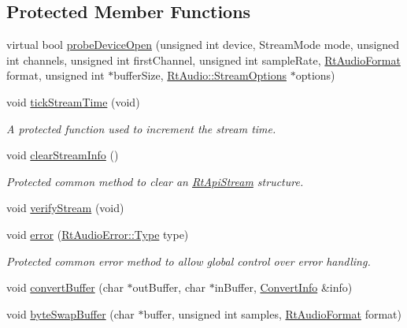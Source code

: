\subsection*{Protected Member Functions}
\begin{DoxyCompactItemize}
\item 
virtual bool \hyperlink{class_rt_api_a7cb2af485df310d803e7a35d3e4a2c1b}{probe\+Device\+Open} (unsigned int device, Stream\+Mode mode, unsigned int channels, unsigned int first\+Channel, unsigned int sample\+Rate, \hyperlink{_rt_audio_8h_aafca92882d25915560018873221e44b8}{Rt\+Audio\+Format} format, unsigned int $\ast$buffer\+Size, \hyperlink{struct_rt_audio_1_1_stream_options}{Rt\+Audio\+::\+Stream\+Options} $\ast$options)
\item 
void \hyperlink{class_rt_api_ae20a4060301413ddcddc6bf149bbf911}{tick\+Stream\+Time} (void)\hypertarget{class_rt_api_ae20a4060301413ddcddc6bf149bbf911}{}\label{class_rt_api_ae20a4060301413ddcddc6bf149bbf911}

\begin{DoxyCompactList}\small\item\em A protected function used to increment the stream time. \end{DoxyCompactList}\item 
void \hyperlink{class_rt_api_adb7ab7111510e3db1f0884a68926b5a4}{clear\+Stream\+Info} ()\hypertarget{class_rt_api_adb7ab7111510e3db1f0884a68926b5a4}{}\label{class_rt_api_adb7ab7111510e3db1f0884a68926b5a4}

\begin{DoxyCompactList}\small\item\em Protected common method to clear an \hyperlink{struct_rt_api_1_1_rt_api_stream}{Rt\+Api\+Stream} structure. \end{DoxyCompactList}\item 
void \hyperlink{class_rt_api_acb0a053f68f082bb0f7ed4d056be1ea6}{verify\+Stream} (void)
\item 
void \hyperlink{class_rt_api_a991f6626a0b1a79f0fec1c6a7bcebb9e}{error} (\hyperlink{class_rt_audio_error_a85bdee746d5ba80d655ac98ded21d073}{Rt\+Audio\+Error\+::\+Type} type)\hypertarget{class_rt_api_a991f6626a0b1a79f0fec1c6a7bcebb9e}{}\label{class_rt_api_a991f6626a0b1a79f0fec1c6a7bcebb9e}

\begin{DoxyCompactList}\small\item\em Protected common error method to allow global control over error handling. \end{DoxyCompactList}\item 
void \hyperlink{class_rt_api_a85ed0a3827faddf0c796869e72800850}{convert\+Buffer} (char $\ast$out\+Buffer, char $\ast$in\+Buffer, \hyperlink{struct_rt_api_1_1_convert_info}{Convert\+Info} \&info)
\item 
void \hyperlink{class_rt_api_a0d1b716b762e865a5b460be2117bb5ed}{byte\+Swap\+Buffer} (char $\ast$buffer, unsigned int samples, \hyperlink{_rt_audio_8h_aafca92882d25915560018873221e44b8}{Rt\+Audio\+Format} format)\hypertarget{class_rt_api_a0d1b716b762e865a5b460be2117bb5ed}{}\label{class_rt_api_a0d1b716b762e865a5b460be2117bb5ed}


\end{DoxyCompactItemize}
